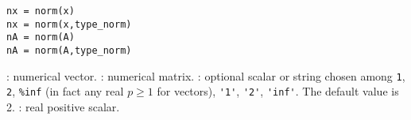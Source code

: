 \begin{mandesc}
\end{mandesc}
\begin{calling_sequence}
\begin{verbatim}
nx = norm(x)
nx = norm(x,type_norm)
nA = norm(A)
nA = norm(A,type_norm)
\end{verbatim}
\end{calling_sequence}
\begin{parameters}
  \begin{varlist}
    :  numerical vector.
    :  numerical matrix.
    : optional scalar or string chosen among
    \verb+1+, \verb+2+, \verb+%inf+ (in fact any real $p \ge 1$ for vectors),
    \verb+'1'+, \verb+'2'+, \verb+'inf'+. The default value is 2.
    : real positive scalar.
  \end{varlist}
\end{parameters}

